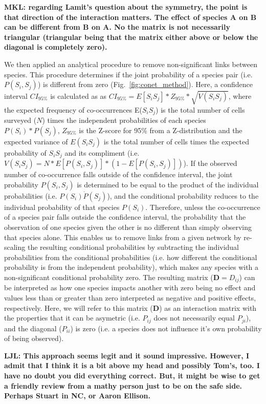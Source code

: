 \documentclass[9pt,twocolumn,twoside,lineno]{pnas-new}
\begin{document}
{\textbf{MKL: regarding Lamit's question about the symmetry, the point
  is that direction of the interaction matters. The effect of species
  A on B can be different from B on A. No the matrix is not
  necessarily triangular (triangular being that the matrix either
  above or below the diagonal is completely zero).}

We then applied an analytical procedure to remove non-significant
links between species. This procedure determines if the joint
probability of a species pair (i.e. $P(S_i,S_j)$) is different from
zero (Fig.~\ref{fig:conet_method}).  Here, a confidence interval
$CI_{95\%}$ is calculated as as $CI_{95\%} = E[S_iS_j] * Z_{95\%} *
\sqrt{V(S_iS_j)}$, where the expected frequency of co-occurrences
E($S_iS_j$) is the total number of cells surveyed ($N$) times the
independent probabilities of each species $P(S_i) * P(S_j)$,
$Z_{95\%}$ is the Z-score for 95\% from a Z-distribution and the
expected variance of $E(S_iS_j)$ is the total number of cells times
the expected probability of $S_iS_j$ and its compliment
(i.e. $V(S_iS_j) = N * E[P(S_i,S_j)] * (1 - E[P(S_i,S_j)])$). If the
observed number of co-occurrence falls outside of the confidence
interval, the joint probability $P(S_i,S_j)$ is determined to be equal
to the product of the individual probabilities (i.e. $P(S_i) \dot
P(S_j)$), and the conditional probability reduces to the individual
probability of that species $P(S_i)$. Therefore, unless the
co-occurrence of a species pair falls outside the confidence interval,
the probability that the observation of one species given the other is
no different than simply observing that species alone. This enables us
to remove links from a given network by re-scaling the resulting
conditional probabilities by subtracting the individual probabilities
from the conditional probabilities (i.e. how different the conditional
probability is from the independent probability), which makes any
species with a non-significant conditional probability zero. The
resulting matrix ($\mathbf{D} = D_{ij}$) can be interpreted as how one
species impacts another with zero being no effect and values less than
or greater than zero interpreted as negative and positive effects,
respectively. Here, we will refer to this matrix ($\mathbf{D}$) as an
interaction matrix with the properties that it can be asymetric
(i.e. $P_{ij}$ does not necessarily equal $P_{ji}$), and the diagonal
($P_{ii}$) is zero (i.e. a species does not influence it's own
probability of being observed).

\textbf{LJL: This approach seems legit and it sound
  impressive. However, I admit that I think it is a bit above my head
  and possibly Tom’s, too. I have no doubt you did everything
  correct. But, it might be wise to get a friendly review from a mathy
  person just to be on the safe side. Perhaps Stuart in NC, or Aaron
  Ellison.} 

}
\end{document}
